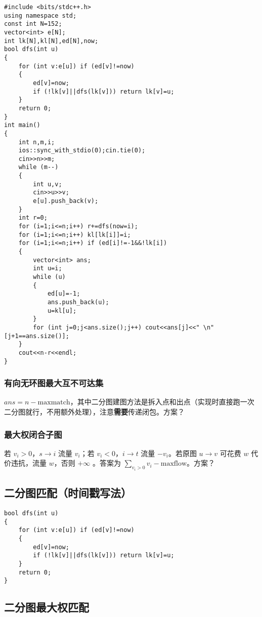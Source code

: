 \documentclass[12pt]{ctexart}
\begin{document}
\begin{lstlisting}
#include <bits/stdc++.h>
using namespace std;
const int N=152;
vector<int> e[N];
int lk[N],kl[N],ed[N],now;
bool dfs(int u)
{
	for (int v:e[u]) if (ed[v]!=now)
	{
		ed[v]=now;
		if (!lk[v]||dfs(lk[v])) return lk[v]=u;
	}
	return 0;
}
int main()
{
	int n,m,i;
	ios::sync_with_stdio(0);cin.tie(0);
	cin>>n>>m;
	while (m--)
	{
		int u,v;
		cin>>u>>v;
		e[u].push_back(v);
	}
	int r=0;
	for (i=1;i<=n;i++) r+=dfs(now=i);
	for (i=1;i<=n;i++) kl[lk[i]]=i;
	for (i=1;i<=n;i++) if (ed[i]!=-1&&!lk[i])
	{
		vector<int> ans;
		int u=i;
		while (u)
		{
			ed[u]=-1;
			ans.push_back(u);
			u=kl[u];
		}
		for (int j=0;j<ans.size();j++) cout<<ans[j]<<" \n"[j+1==ans.size()];
	}
	cout<<n-r<<endl;
}
\end{lstlisting}

\subsubsection{有向无环图最大互不可达集}

$ans=n-\text{maxmatch}$，其中二分图建图方法是拆入点和出点（实现时直接跑一次二分图就行，不用额外处理），注意\textbf{需要}传递闭包。方案？

\subsubsection{最大权闭合子图}

若 $v_i>0$，$s\to i$ 流量 $v_i$；若 $v_i<0$，$i\to t$ 流量 $-v_i$。若原图 $u\to v$ 可花费 $w$ 代价违抗，流量 $w$，否则 $+\infty$ 。答案为 $\sum\limits_{v_i>0} v_i-\text{maxflow}$。方案？

\subsection{二分图匹配（时间戳写法）}

\begin{lstlisting}
bool dfs(int u)
{
	for (int v:e[u]) if (ed[v]!=now)
	{
		ed[v]=now;
		if (!lk[v]||dfs(lk[v])) return lk[v]=u;
	}
	return 0;
}
\end{lstlisting}

\subsection{二分图最大权匹配}
\end{document}
